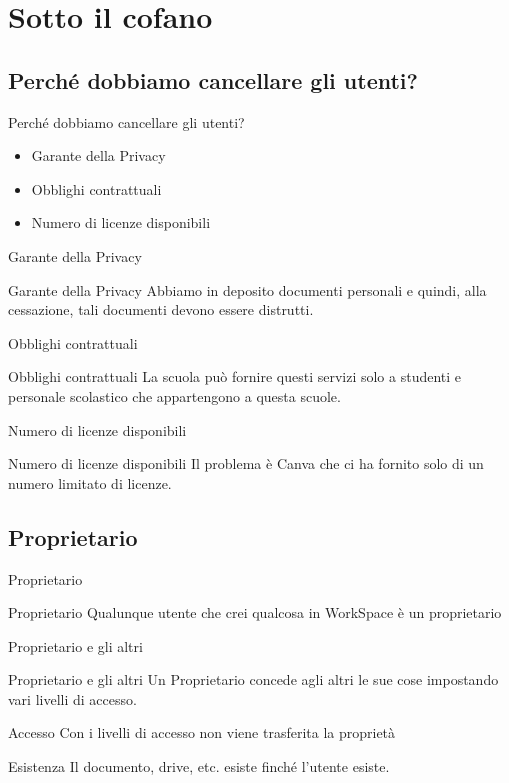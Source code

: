 \documentclass{beamer}
\begin{document}
\section{Sotto il cofano}
\subsection{Perché dobbiamo cancellare gli utenti?}
\begin{frame}{Perché dobbiamo cancellare gli utenti?}
	\begin{itemize}
		\item<1-> Garante della Privacy
		\item<2-> Obblighi contrattuali
		\item<3-> Numero di licenze disponibili
	\end{itemize}
\end{frame}
\begin{frame}{Garante della Privacy}
\begin{exampleblock}{Garante della Privacy}
Abbiamo in deposito documenti personali e quindi, alla cessazione, tali documenti devono essere distrutti.
\end{exampleblock}
\end{frame}
\begin{frame}{Obblighi contrattuali}
	\begin{block}{Obblighi contrattuali}
	La scuola può fornire questi servizi solo a studenti e personale scolastico che appartengono a questa scuole.
	\end{block}
\end{frame}
\begin{frame}{Numero di licenze disponibili}
	\begin{alertblock}{Numero di licenze disponibili}
		Il problema è Canva che ci ha fornito solo di un numero limitato di licenze.
	\end{alertblock}
\end{frame}
\subsection{Proprietario}
\begin{frame}[standout]{Proprietario}
	\begin{block}{Proprietario}
	Qualunque utente che crei qualcosa in WorkSpace è un proprietario
	\end{block}
\end{frame}
\begin{frame}{Proprietario e gli altri}
	\begin{block}{Proprietario e gli altri}
	Un Proprietario concede agli altri le sue cose impostando vari livelli di accesso.
	\end{block}
	\begin{alertblock}{Accesso}
		Con i livelli di accesso non viene trasferita la proprietà  
	\end{alertblock}
	\begin{exampleblock}{Esistenza}
		Il documento, drive, etc. esiste finché  l'utente esiste.
	\end{exampleblock}
\end{frame}
\end{document}
